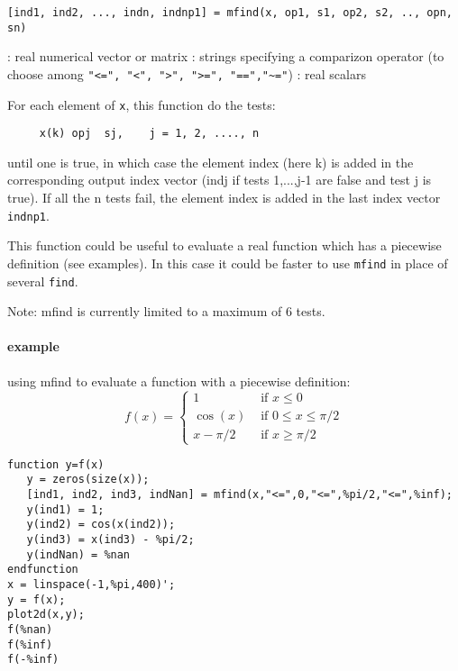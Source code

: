 
\begin{mandesc}
\end{mandesc}

\begin{calling_sequence}
\begin{verbatim}
[ind1, ind2, ..., indn, indnp1] = mfind(x, op1, s1, op2, s2, .., opn, sn)
\end{verbatim}
\end{calling_sequence}
\begin{parameters}
  \begin{varlist}
    :  real numerical vector or matrix
    : strings specifying a comparizon operator (to choose among \verb+"<=", "<", ">", ">=", "==","~="+)
    :  real scalars
  \end{varlist}
\end{parameters}

\begin{mandescription}
For each element of \verb+x+, this function do the tests:
\begin{verbatim}
     x(k) opj  sj,    j = 1, 2, ...., n
\end{verbatim}
until one is true, in which case the element index (here k) is added in the
corresponding output index vector (indj if tests 1,...,j-1 are false and test j is true).
If all the n tests fail, the element index is added in the last index vector \verb+indnp1+.

This function could be useful to evaluate a real function which has a piecewise definition
(see examples). In this case it could be faster to use \verb+mfind+ in place of several \verb+find+.

Note: mfind is currently limited to a maximum of 6 tests.
\end{mandescription}

\begin{examples}
  
\paragraph{example}
using mfind to evaluate a function with a piecewise definition: 
$$
f(x) = \left\{ \begin{array}{ll}
    1     & \mbox{ if } x \le 0 \\
  \cos(x) & \mbox{ if } 0 \le x \le \pi/2 \\
  x-\pi/2 & \mbox{ if } x \ge  \pi/2 
\end{array}\right.
$$
\begin{Verbatim}
function y=f(x) 
   y = zeros(size(x)); 
   [ind1, ind2, ind3, indNan] = mfind(x,"<=",0,"<=",%pi/2,"<=",%inf); 
   y(ind1) = 1; 
   y(ind2) = cos(x(ind2)); 
   y(ind3) = x(ind3) - %pi/2; 
   y(indNan) = %nan 
endfunction 
x = linspace(-1,%pi,400)'; 
y = f(x); 
plot2d(x,y); 
f(%nan) 
f(%inf) 
f(-%inf) 
\end{Verbatim}

 
\end{examples}

